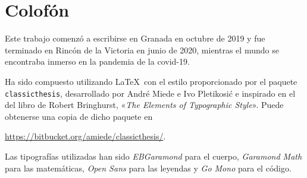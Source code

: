 \pagestyle{empty}

\hfill

\vfill


\section*{Colofón}
Este trabajo comenzó a escribirse en Granada en octubre de 2019 y fue terminado en Rincón de la Victoria en junio de 2020, mientras el mundo se encontraba inmerso en la pandemia de la covid-19.

Ha sido compuesto utilizando \LaTeX\ con el estilo proporcionado por el paquete \texttt{classicthesis}, desarrollado por André Miede e Ivo Pletikosić e inspirado en el del libro de Robert Bringhurst, «\emph{The Elements of Typographic Style}».
Puede obtenerse una copia de dicho paquete en
\begin{center}
\url{https://bitbucket.org/amiede/classicthesis/}.
\end{center}
Las tipografías utilizadas han sido \emph{EBGaramond} para el cuerpo, \emph{Garamond Math} para las matemáticas, \emph{Open Sans} para las leyendas y \emph{Go Mono} para el código.
\bigskip